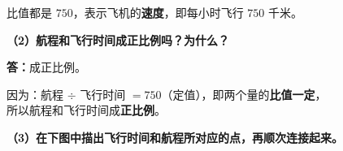 \documentclass[12pt, a4paper]{ctexrep}
\begin{document}
\noindent
比值都是 $750$，表示飞机的\textbf{\textcolor{red!70!black}{速度}}，即每小时飞行 $750$ 千米。

\vspace{0.6cm}

\noindent\textbf{（2）航程和飞行时间成正比例吗？为什么？}

\vspace{0.3cm}

\noindent
\textbf{答：}成正比例。

\vspace{0.2cm}

\noindent
因为：航程 $\div$ 飞行时间 $= 750$（定值），即两个量的\textbf{比值一定}，\\[4pt]
所以航程和飞行时间成\textbf{\textcolor{red!70!black}{正比例}}。

\vspace{0.6cm}

\noindent\textbf{（3）在下图中描出飞行时间和航程所对应的点，再顺次连接起来。}

\vspace{0.4cm}
\end{document}

